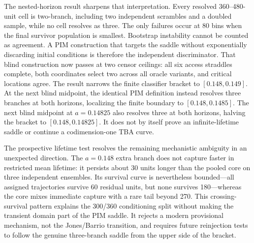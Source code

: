 The nested-horizon result sharpens that interpretation.  Every resolved
360--480-unit cell is two-branch, including two independent scrambles and a
doubled sample, while no cell resolves as three.  The only failures occur at
80 bins when the final survivor population is smallest.  Bootstrap instability
cannot be counted as agreement.  A PIM construction that targets
the saddle without exponentially discarding initial conditions is therefore
the independent discriminator.  That blind construction now passes at two
censor ceilings: all six access straddles complete, both coordinates select
two across all oracle variants, and critical locations agree.  The result
narrows the finite classifier bracket to $[0.148,0.149]$.  At the next blind midpoint, the
identical PIM definition instead resolves three branches at both horizons,
localizing the finite boundary to $[0.148,0.1485]$.  The next blind midpoint at
$a=0.14825$ also resolves three at both horizons, halving the bracket to
$[0.148,0.14825]$.  It does not by itself prove an
infinite-lifetime saddle or continue a codimension-one TBA curve.

The prospective lifetime test resolves the remaining mechanistic ambiguity in
an unexpected direction.  The $a=0.148$ extra branch does not capture faster
in restricted mean lifetime: it persists about 30 units longer than the pooled
core on three independent ensembles.  Its survival curve is nevertheless
bounded---all assigned trajectories survive 60 residual units, but none
survives 180---whereas the core mixes immediate capture with a rare tail beyond
270.  This crossing-survival pattern explains the 300/360 conditioning split
without making the transient domain part of the PIM saddle.  It rejects a
modern provisional mechanism, not the Jones/Barrio transition, and requires
future reinjection tests to follow the genuine three-branch saddle from the
upper side of the bracket.


